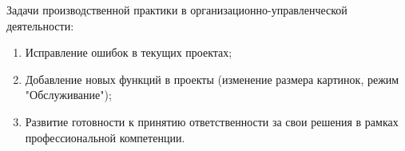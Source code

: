 Задачи производственной практики в организационно-управленческой деятельности:
\begin{enumerate}
    \item Исправление ошибок в текущих проектах;
    \item Добавление новых функций в проекты (изменение размера картинок, режим "Обслуживание");
    \item Развитие готовности к принятию ответственности за свои решения в рамках профессиональной компетенции.
\end{enumerate}
